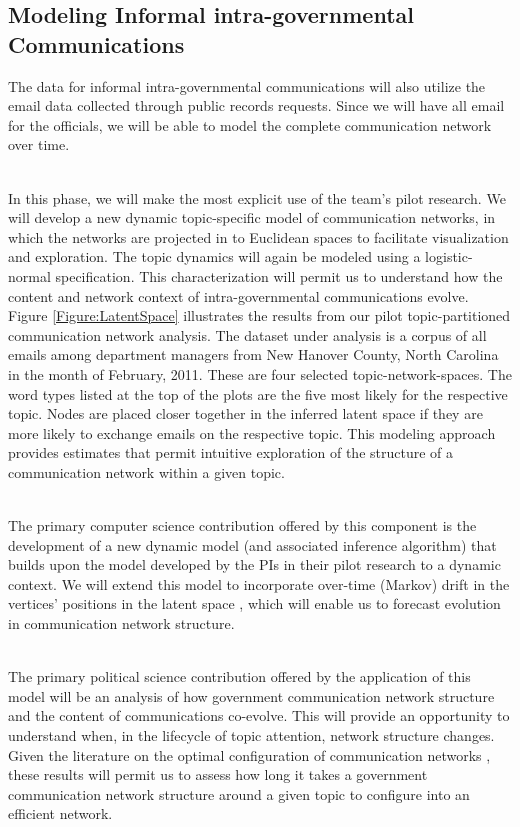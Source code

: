 \subsection{Modeling Informal intra-governmental Communications}

 The data for informal
intra-governmental communications will also utilize the email data
collected through public records requests. Since we will have all
email for the officials, we will be able to model the complete
communication network over time.

~\\
 In this phase, we will make the
most explicit use of the team's pilot research. We will develop a new
dynamic topic-specific model of communication networks, in which the
networks are projected in to Euclidean spaces to facilitate
visualization and exploration. The topic dynamics will again be
modeled using a logistic-normal specification. This characterization
will permit us to understand how the content and network context of
intra-governmental communications evolve. Figure
\ref{Figure:LatentSpace} illustrates the results from our pilot
topic-partitioned communication network analysis. The dataset under
analysis is a corpus of all emails among department managers from New
Hanover County, North Carolina in the month of February, 2011. These
are four selected topic-network-spaces. The word types listed at the
top of the plots are the five most likely for the respective
topic. Nodes are placed closer together in the inferred latent space
if they are more likely to exchange emails on the respective
topic. This modeling approach provides estimates that permit intuitive
exploration of the structure of a communication network within a given
topic.

~\\
 The primary computer
science contribution offered by this component is the development of a
new dynamic model (and associated inference algorithm) that builds
upon the model developed by the PIs in their pilot research
\cite{Krafft2012} to a dynamic context. We will extend this model to
incorporate over-time (Markov) drift in the vertices' positions in the
latent space \cite{Sarkar2005}, which will enable us to forecast
evolution in communication network structure.

~\\
 The primary political science contribution offered by the application of this model will be an analysis of how government communication network structure and the content of communications co-evolve. This will provide an opportunity to understand when, in the lifecycle of topic attention, network structure changes. Given the literature on the optimal configuration of communication networks \cite{Mason2008,Mason2012}, these results will permit us to assess how long it takes  a government communication network structure around a given topic to configure into an efficient network.




